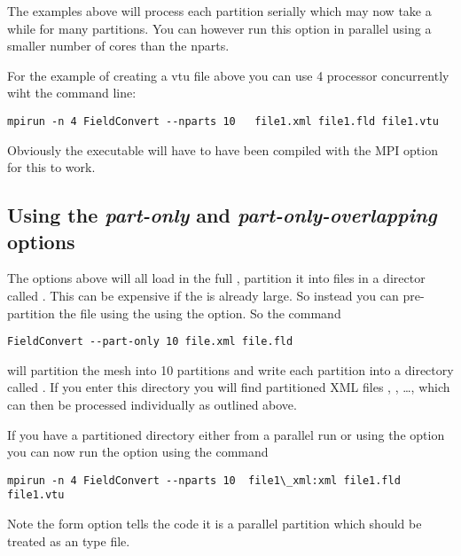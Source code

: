 The examples above will process each partition serially which may now
take a while for many partitions. You can however run this option in
parallel using a smaller number of cores than the nparts.

For the example of creating a vtu file above you can use 4 processor concurrently wiht the command line:
\begin{lstlisting}[style=BashInputStyle]
mpirun -n 4 FieldConvert --nparts 10   file1.xml file1.fld file1.vtu
\end{lstlisting}

Obviously the executable will have to have been compiled with the MPI option for this to work. 

\subsection{Using the \textit{ part-only} and \textit{ part-only-overlapping} options}

The options above will all load in the full , partition
it into  files in a director called .
This can be expensive if the  is already large. So instead you can
pre-partition the file using the using the  
option. So the command
\begin{lstlisting}[style=BashInputStyle]
FieldConvert --part-only 10 file.xml file.fld
\end{lstlisting}
will partition the mesh into 10 partitions and write each partition into a
directory called . If you enter this directory you will find
partitioned XML files , , \dots,
 which can then be processed individually as outlined above.

If you have a partitioned directory either from a parallel run or using the  option  you can now run the  option using the command
\begin{lstlisting}[style=BashInputStyle]
mpirun -n 4 FieldConvert --nparts 10  file1\_xml:xml file1.fld file1.vtu
\end{lstlisting}

Note the form  option tells the code it is a parallel partition which should be treated as an  type file. 

